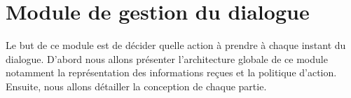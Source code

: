 		
\section{Module de gestion du dialogue}
Le but de ce module est de décider quelle action à prendre à chaque instant du dialogue. D'abord nous allons présenter l'architecture globale de ce module notamment la représentation des informations reçues et la politique d'action. Ensuite, nous allons détailler la conception de chaque partie.
